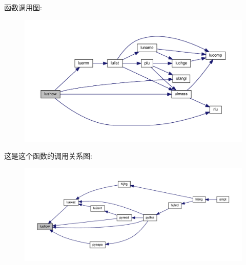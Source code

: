 函数调用图\+:
\nopagebreak
\begin{figure}[H]
\begin{center}
\leavevmode
\includegraphics[width=350pt]{lushow_8f90_ac3b103459060e67e9e881ddad4b52cef_cgraph}
\end{center}
\end{figure}
这是这个函数的调用关系图\+:
\nopagebreak
\begin{figure}[H]
\begin{center}
\leavevmode
\includegraphics[width=350pt]{lushow_8f90_ac3b103459060e67e9e881ddad4b52cef_icgraph}
\end{center}
\end{figure}
